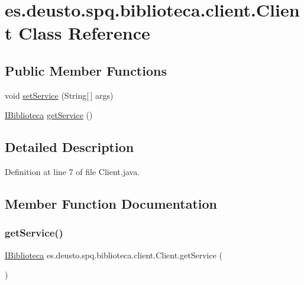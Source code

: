 \hypertarget{classes_1_1deusto_1_1spq_1_1biblioteca_1_1client_1_1_client}{}\section{es.\+deusto.\+spq.\+biblioteca.\+client.\+Client Class Reference}
\label{classes_1_1deusto_1_1spq_1_1biblioteca_1_1client_1_1_client}
\subsection*{Public Member Functions}
\begin{DoxyCompactItemize}
\item 
void \mbox{\hyperlink{classes_1_1deusto_1_1spq_1_1biblioteca_1_1client_1_1_client_a96d3aee6ac3ad17ea896e4c50115bdf6}{set\+Service}} (String\mbox{[}$\,$\mbox{]} args)
\item 
\mbox{\hyperlink{interfacees_1_1deusto_1_1spq_1_1biblioteca_1_1remote_1_1_i_biblioteca}{I\+Biblioteca}} \mbox{\hyperlink{classes_1_1deusto_1_1spq_1_1biblioteca_1_1client_1_1_client_a81c65efd5ee6eb820c325225532fa3fb}{get\+Service}} ()
\end{DoxyCompactItemize}


\subsection{Detailed Description}


Definition at line 7 of file Client.\+java.



\subsection{Member Function Documentation}
\mbox{\label{classes_1_1deusto_1_1spq_1_1biblioteca_1_1client_1_1_client_a81c65efd5ee6eb820c325225532fa3fb}} 
\subsubsection{\texorpdfstring{get\+Service()}{getService()}}
{\footnotesize\ttfamily \mbox{\hyperlink{interfacees_1_1deusto_1_1spq_1_1biblioteca_1_1remote_1_1_i_biblioteca}{I\+Biblioteca}} es.\+deusto.\+spq.\+biblioteca.\+client.\+Client.\+get\+Service (\begin{DoxyParamCaption}{ }\end{DoxyParamCaption})}



